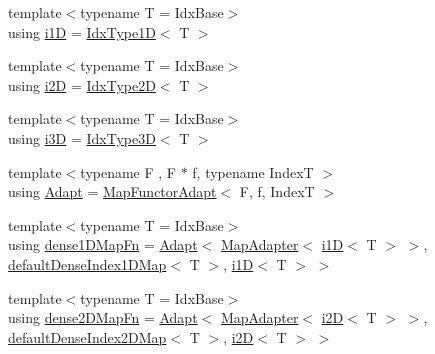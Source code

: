 \begin{DoxyCompactItemize}
\item 
{\footnotesize template$<$typename T  = Idx\+Base$>$ }\\using \hyperlink{namespacevt_1_1mapping_af0c14a9a77e0311b3d089143ed93ba76}{i1D} = \hyperlink{namespacevt_a36127c6500f2311908c959be653da40e}{Idx\+Type1D}$<$ T $>$
\item 
{\footnotesize template$<$typename T  = Idx\+Base$>$ }\\using \hyperlink{namespacevt_1_1mapping_a6448c875e0807b43f31e96fc5b0cec04}{i2D} = \hyperlink{namespacevt_ab0fbc5ddf69b5aa0ed6a8d1658b504eb}{Idx\+Type2D}$<$ T $>$
\item 
{\footnotesize template$<$typename T  = Idx\+Base$>$ }\\using \hyperlink{namespacevt_1_1mapping_af435b967b9ed1ccb5ec4effdbd9abd13}{i3D} = \hyperlink{namespacevt_a65e4a83c0567ecb7a54b78e9b8e7d7ab}{Idx\+Type3D}$<$ T $>$
\item 
{\footnotesize template$<$typename F , F $\ast$ f, typename IndexT $>$ }\\using \hyperlink{namespacevt_1_1mapping_aafe187035ce8df02f31983e37cdb6a5d}{Adapt} = \hyperlink{namespacevt_1_1mapping_add4b5257a62b56d194f7e931b608f8f0}{Map\+Functor\+Adapt}$<$ F, f, IndexT $>$
\item 
{\footnotesize template$<$typename T  = Idx\+Base$>$ }\\using \hyperlink{namespacevt_1_1mapping_afe31b6db2c26ee24a6dd3cdf7b68415f}{dense1\+D\+Map\+Fn} = \hyperlink{namespacevt_1_1mapping_aafe187035ce8df02f31983e37cdb6a5d}{Adapt}$<$ \hyperlink{namespacevt_1_1mapping_a41b113c28bb6430fbcb5be66e08ccf9f}{Map\+Adapter}$<$ \hyperlink{namespacevt_1_1mapping_af0c14a9a77e0311b3d089143ed93ba76}{i1D}$<$ T $>$ $>$, \hyperlink{namespacevt_1_1mapping_ae055a42b89a59fd6d0cc6d40f9abf3b5}{default\+Dense\+Index1\+D\+Map}$<$ T $>$, \hyperlink{namespacevt_1_1mapping_af0c14a9a77e0311b3d089143ed93ba76}{i1D}$<$ T $>$ $>$
\item 
{\footnotesize template$<$typename T  = Idx\+Base$>$ }\\using \hyperlink{namespacevt_1_1mapping_afea13b390fab1d1388658ed759f9f44f}{dense2\+D\+Map\+Fn} = \hyperlink{namespacevt_1_1mapping_aafe187035ce8df02f31983e37cdb6a5d}{Adapt}$<$ \hyperlink{namespacevt_1_1mapping_a41b113c28bb6430fbcb5be66e08ccf9f}{Map\+Adapter}$<$ \hyperlink{namespacevt_1_1mapping_a6448c875e0807b43f31e96fc5b0cec04}{i2D}$<$ T $>$ $>$, \hyperlink{namespacevt_1_1mapping_a011c4e2cb832d3edcd98e3803d405ad4}{default\+Dense\+Index2\+D\+Map}$<$ T $>$, \hyperlink{namespacevt_1_1mapping_a6448c875e0807b43f31e96fc5b0cec04}{i2D}$<$ T $>$ $>$

\end{DoxyCompactItemize}
